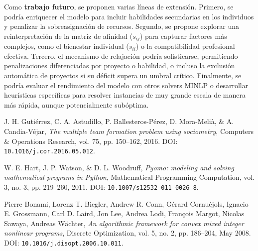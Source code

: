 \documentclass[conference]{IEEEtran}
\begin{document}
Como \textbf{trabajo futuro}, se proponen varias líneas de extensión. Primero, se podría enriquecer el modelo para incluir habilidades secundarias en los individuos y penalizar la sobreasignación de recursos. Segundo, se propone explorar una reinterpretación de la matriz de afinidad ($s_{ij}$) para capturar factores más complejos, como el bienestar individual ($s_{ii}$) o la compatibilidad profesional efectiva. Tercero, el mecanismo de relajación podría sofisticarse, permitiendo penalizaciones diferenciadas por proyecto o habilidad, o incluso la exclusión automática de proyectos si su déficit supera un umbral crítico. Finalmente, se podría evaluar el rendimiento del modelo con otros solvers MINLP o desarrollar heurísticas específicas para resolver instancias de muy grande escala de manera más rápida, aunque potencialmente subóptima.


\begin{thebibliography}{00}

    J. H. Gutiérrez, C. A. Astudillo, P. Ballesteros-Pérez, D. Mora-Melià, \& A. Candia-Véjar,
    \textit{The multiple team formation problem using sociometry},
    Computers \& Operations Research, vol. 75, pp. 150--162, 2016. DOI: \texttt{10.1016/j.cor.2016.05.012}.

    W. E. Hart, J. P. Watson, \& D. L. Woodruff,
    \textit{Pyomo: modeling and solving mathematical programs in Python},
    Mathematical Programming Computation, vol. 3, no. 3, pp. 219--260, 2011. DOI: \texttt{10.1007/s12532-011-0026-8}.


    Pierre Bonami, Lorenz T. Biegler, Andrew R. Conn, Gérard Cornuéjols, Ignacio E. Grossmann, Carl D. Laird, Jon Lee, Andrea Lodi, François Margot, Nicolas Sawaya, Andreas Wächter,
    \textit{An algorithmic framework for convex mixed integer nonlinear programs},
    Discrete Optimization, vol. 5, no. 2, pp. 186--204, May 2008. DOI: \texttt{10.1016/j.disopt.2006.10.011}.

\end{thebibliography}
\end{document}
